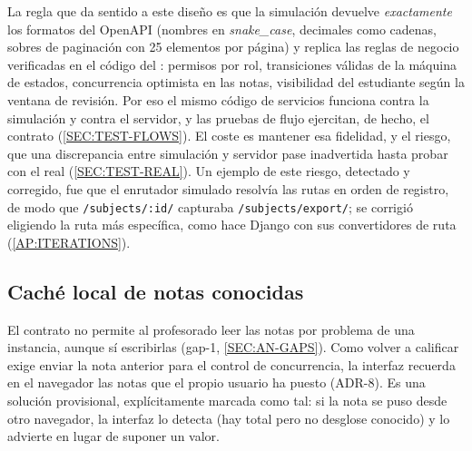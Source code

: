 La regla que da sentido a este diseño es que la simulación devuelve \emph{exactamente} los
formatos del OpenAPI (nombres en \textit{snake\_case}, decimales como cadenas, sobres de
paginación con 25 elementos por página) y replica las reglas de negocio verificadas en el
código del : permisos por rol, transiciones válidas de la máquina de estados,
concurrencia optimista en las notas, visibilidad del estudiante según la ventana de
revisión. Por eso el mismo código de servicios funciona contra la simulación y contra el
servidor, y las pruebas de flujo ejercitan, de hecho, el contrato
(\cref{SEC:TEST-FLOWS}). El coste es mantener esa fidelidad, y el riesgo, que una
discrepancia entre simulación y servidor pase inadvertida hasta probar con el
 real (\cref{SEC:TEST-REAL}). Un ejemplo de este riesgo, detectado y
corregido, fue que el enrutador simulado resolvía las rutas en orden de registro, de modo
que \texttt{/subjects/:id/} capturaba \texttt{/subjects/export/}; se corrigió eligiendo la
ruta más específica, como hace Django con sus convertidores de ruta (\cref{AP:ITERATIONS}).

\subsection{Caché local de notas conocidas}

El contrato no permite al profesorado leer las notas por problema de una instancia, aunque
sí escribirlas (gap-1, \cref{SEC:AN-GAPS}). Como volver a calificar exige enviar la nota
anterior para el control de concurrencia, la interfaz recuerda en el navegador las notas
que el propio usuario ha puesto (ADR-8). Es una solución provisional, explícitamente
marcada como tal: si la nota se puso desde otro navegador, la interfaz lo detecta (hay
total pero no desglose conocido) y lo advierte en lugar de suponer un valor.
